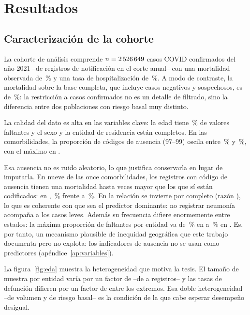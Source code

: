 \chapter{Resultados}
\label{cap:resultados}

\section{Caracterización de la cohorte}

La cohorte de análisis comprende $n=2\,526\,649$ casos COVID confirmados del año
2021 --de \nBaseCompleta{} registros de notificación en el corte anual-- con una
mortalidad observada de \cohorteTasaDef\,\% y una tasa de hospitalización de
\tasaHospCohorte\,\%. A modo de contraste, la mortalidad sobre la base completa,
que incluye casos negativos y sospechosos, es de \tasaDefBase\,\%: la restricción
a casos confirmados no es un detalle de filtrado, sino la diferencia entre dos
poblaciones con riesgo basal muy distinto.

La calidad del dato es alta en las variables clave: la edad tiene
\faltEdad\,\% de valores faltantes y el sexo y la entidad de residencia están
completos. En las comorbilidades, la proporción de códigos de ausencia (97--99)
oscila entre \naComorbMin\,\% y \naComorbMax\,\%, con el máximo en
\texttt{\naComorbMaxVar}.

Esa ausencia no es ruido aleatorio, lo que justifica conservarla en lugar de
imputarla. En nueve de las once comorbilidades, los registros con código de
ausencia tienen una mortalidad hasta \naRazonMax{} veces mayor que los que sí
están codificados: en \texttt{\naVarMax}, \naMortConNa\,\% frente a
\naMortSinNa\,\%. En \texttt{\naVarMin} la relación se invierte por completo
(razón \naRazonMin), lo que es coherente con que sea el predictor dominante: no
registrar neumonía acompaña a los casos leves. Además su frecuencia difiere enormemente entre
estados: la máxima proporción de faltantes por entidad va de \naEntMin\,\% en
\naEntMinEnt{} a \naEntMax\,\% en \naEntMaxEnt. Es, por tanto, un mecanismo
plausible de inequidad geográfica que este trabajo documenta pero no explota: los
indicadores de ausencia no se usan como predictores (apéndice~\ref{ap:variables}).

La figura~\ref{fig:eda} muestra la heterogeneidad que motiva la tesis. El tamaño
de muestra por entidad varía por un factor de \entFactorN{} --de \entNmin{} a
\entNmax{} registros-- y las tasas de defunción difieren por un factor de
\entFactorTasa{} entre los extremos. Esa doble heterogeneidad --de volumen y de
riesgo basal-- es la condición de la que cabe esperar desempeño desigual.

